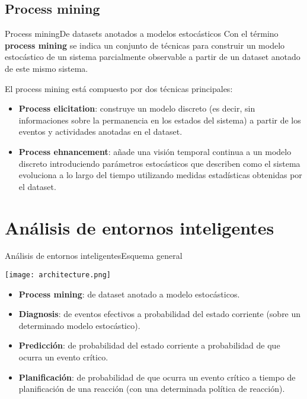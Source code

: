 \documentclass[9pt, handout]{beamer}
\begin{document}
    \subsection{Process mining}
      \begin{frame}{Process mining}{De datasets anotados a modelos estocásticos}
        \pause
        Con el término \textbf{process mining} se indica un conjunto de técnicas para construir un modelo estocástico de un sistema parcialmente observable a partir de un dataset anotado de este mismo sistema.
        
        \pause
        \vspace{1em}
        El process mining está compuesto por dos técnicas principales:
        \pause
        \begin{itemize}
          \item \textbf{Process elicitation}: construye un modelo discreto (es decir, sin informaciones sobre la permanencia en los estados del sistema) a partir de los eventos y actividades anotadas en el dataset.
          \pause
          \item \textbf{Process ehnancement}: añade una visión temporal continua a un modelo discreto introduciendo parámetros estocásticos que describen como el sistema evoluciona a lo largo del tiempo utilizando medidas estadísticas obtenidas por el dataset.
        \end{itemize}
      \end{frame}
    
  \section{Análisis de entornos inteligentes}
  
    \begin{frame}{Análisis de entornos inteligentes}{Esquema general}
      \vspace{-1em}
      \begin{center}
        \texttt{[image: architecture.png]}
      \end{center}
      
      \pause
      \begin{itemize}
        \item \textbf{Process mining}: de dataset anotado a modelo estocásticos.
        \pause
        \item \textbf{Diagnosis}: de eventos efectivos a probabilidad del estado corriente (sobre un determinado modelo estocástico).
        \pause
        \item \textbf{Predicción}: de probabilidad del estado corriente a probabilidad de que ocurra un evento crítico.
        \pause
        \item \textbf{Planificación}: de probabilidad de que ocurra un evento crítico a tiempo de planificación de una reacción (con una determinada política de reacción).
      \end{itemize}
    \end{frame}
  
\end{document}
